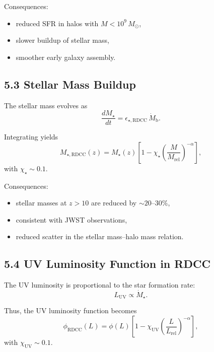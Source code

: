 \documentclass[11pt,a4paper]{article}
\begin{document}
Consequences:

\begin{itemize}
    \item reduced SFR in halos with $M < 10^{9}\,M_{\odot}$,
    \item slower buildup of stellar mass,
    \item smoother early galaxy assembly.
\end{itemize}

\subsection*{5.3 Stellar Mass Buildup}

The stellar mass evolves as
\begin{equation}
    \frac{dM_{\star}}{dt}
    = \epsilon_{\star,\mathrm{RDCC}}\, \dot{M}_{\mathrm{b}}.
\end{equation}

Integrating yields
\begin{equation}
    M_{\star,\mathrm{RDCC}}(z)
    = M_{\star}(z)
      \left[
        1 - \chi_{\star}
        \left(\frac{M}{M_{\mathrm{rel}}}\right)^{-\alpha}
      \right],
\end{equation}
with $\chi_{\star} \sim 0.1$.

Consequences:

\begin{itemize}
    \item stellar masses at $z > 10$ are reduced by $\sim 20$--$30\%$,
    \item consistent with JWST observations,
    \item reduced scatter in the stellar mass–halo mass relation.
\end{itemize}

\subsection*{5.4 UV Luminosity Function in RDCC}

The UV luminosity is proportional to the star formation rate:
\begin{equation}
    L_{\mathrm{UV}}
    \propto \dot{M}_{\star}.
\end{equation}

Thus, the UV luminosity function becomes
\begin{equation}
    \phi_{\mathrm{RDCC}}(L)
    = \phi(L)
      \left[
        1 - \chi_{\mathrm{UV}}
        \left(\frac{L}{L_{\mathrm{rel}}}\right)^{-\alpha}
      \right],
\end{equation}
with $\chi_{\mathrm{UV}} \sim 0.1$.
\end{document}

